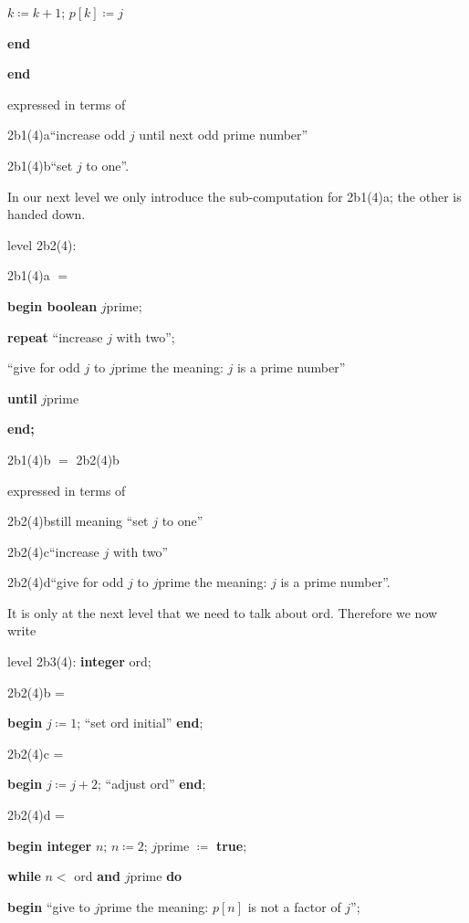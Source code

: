 \noindent
\quad\quad $k \coloneq k + 1$; $p[k] \coloneq j$

\noindent
\quad\textbf{end}

\noindent
\textbf{end}

\noindent
expressed in terms of

\noindent
2b1(4)a\quad\quad ``increase odd $j$ until next odd prime number''

\noindent
2b1(4)b\quad\quad ``set $j$ to one''.

In our next level we only introduce the sub-computation for 2b1(4)a; the other is handed down.

\noindent
level 2b2(4):

\noindent
2b1(4)a $=$

\noindent
\textbf{begin boolean} $j$prime;

\noindent
\quad\textbf{repeat} ``increase $j$ with two'';

\noindent
\quad\quad ``give for odd $j$ to $j$prime the meaning: $j$ is a prime number''

\noindent
\quad\textbf{until} $j$prime

\noindent
\textbf{end;}

\noindent
2b1(4)b $=$ 2b2(4)b

\noindent
expressed in terms of

\noindent
2b2(4)b\quad\quad still meaning ``set $j$ to one''

\noindent
2b2(4)c\quad\quad ``increase $j$ with two''

\noindent
2b2(4)d\quad\quad ``give for odd $j$ to $j$prime the meaning: $j$ is a prime number''.

It is only at the next level that we need to talk about ord. Therefore we now write

\noindent
level 2b3(4): \textbf{integer} ord;

\noindent
2b2(4)b =

\noindent
\textbf{begin} $j \coloneq 1$; ``set ord initial'' \textbf{end};

\noindent
2b2(4)c =

\noindent
\textbf{begin} $j \coloneq j + 2$; ``adjust ord'' \textbf{end};

\noindent
2b2(4)d =

\noindent
\textbf{begin integer} $n$; $n \coloneq 2$; $j$prime $\coloneq$ \textbf{true};

\noindent
\quad\textbf{while} $n <$ ord \textbf{and} $j$prime \textbf{do}

\noindent
\quad\quad\textbf{begin} ``give to $j$prime the meaning: $p[n]$ is not a factor of $j$'';

